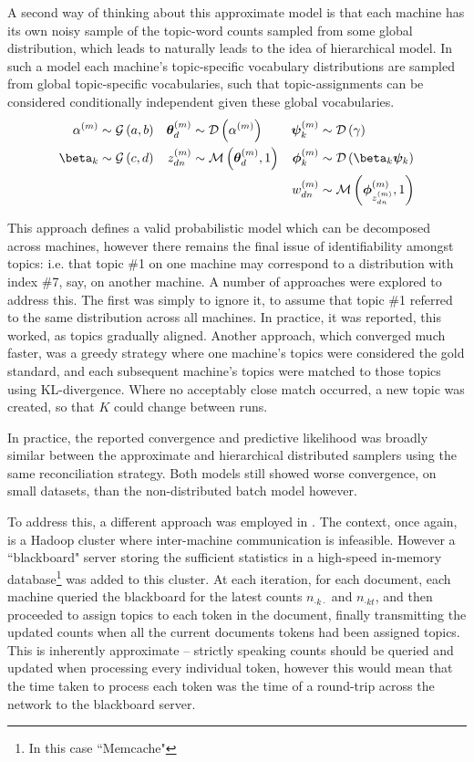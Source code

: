 A second way of thinking about this approximate model is that each machine has its own noisy sample of the topic-word counts sampled from some global distribution, which leads to naturally leads to the idea of hierarchical model. In such a model each machine's topic-specific vocabulary distributions are sampled from global topic-specific vocabularies, such that topic-assignments can be considered conditionally independent given these global vocabularies.
\begin{align}
\alpha^{(m)} & \sim \gam{a}{b} &
\vv{\theta}_d^{(m)} & \sim \dir{\alpha^{(m)}} &
\vv{\psi}_k^{(m)} & \sim \dir{\gamma} \\
\beta_k & \sim \gam{c}{d} &
z_{dn}^{(m)} & \sim \muln{\vv{\theta}_d^{(m)}}{1} &
\vv{\phi}_k^{(m)} & \sim \dir{\beta_k \vv{\psi}_k} \\
& &
& &
w_{dn}^{(m)} & \sim \muln{\vv{\phi}_{z_{dn}^{(m)}}^{(m)}}{1}
\end{align}

This approach defines a valid probabilistic model which can be decomposed across machines, however there remains the final issue of identifiability amongst topics: i.e. that topic \#1 on one machine may correspond to a distribution with index \#7, say, on another machine. A number of approaches were explored to address this. The first was simply to ignore it, to assume that topic \#1 referred to the same distribution across all machines. In practice, it was reported, this worked, as topics gradually aligned. Another approach, which converged much faster, was a greedy strategy where one machine's topics were considered the gold standard, and each subsequent machine's topics were matched to those topics using KL-divergence. Where no acceptably close match occurred, a new topic was created, so that $K$ could change between runs. 

In practice, the reported convergence and predictive likelihood was broadly similar between the approximate and hierarchical distributed samplers using the same reconciliation strategy. Both models still showed worse convergence, on small datasets, than the non-distributed batch model however.

To address this, a different approach was employed in \cite{Smola2010}. The context, once again, is a Hadoop cluster where inter-machine communication is infeasible. However a ``blackboard" server storing the sufficient statistics in a high-speed in-memory database\footnote{In this case ``Memcache"} was added to this cluster. At each iteration, for each document, each machine queried the blackboard for the latest counts $n_{\cdot k \cdot}$ and $n_{\cdot k t}$, and then proceeded to assign topics to each token in the document, finally transmitting the updated counts when all the current documents tokens had been assigned topics. This is inherently approximate -- strictly speaking counts should be queried and updated when processing every individual token, however this would mean that the time taken to process each token was the time of a round-trip across the network to the blackboard server.

